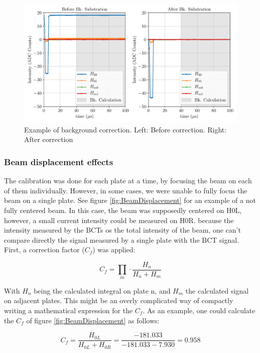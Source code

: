 \begin{figure}[h]
    \centering
    \includegraphics[width=0.85\columnwidth]{Figure_BeforeAfterBackground/BeforeAfterBk.pdf}
    \caption{Example of background correction. Left: Before correction. Right: After correction}
    \label{fig:BackCorrection}
\end{figure}

\subsubsection{Beam displacement effects}

The calibration was done for each plate at a time, by focusing the beam on each of them individually. However, in some cases, we were unable to fully focus the beam on a single plate. See figure \ref{fig:BeamDisplacement} for an example of a not fully centered beam. In this case, the beam was supposedly centered on H0L, however, a small current intensity could be measured on H0R. because the intensity measured by the BCTs os the total intensity of the beam, one can't compare directly the signal measured by a single plate with the BCT signal. First, a correction factor ($C_{f}$) was applied: 

\begin{equation}
    C_f = \prod_{m}  \cdot \frac{H_n}{H_n + H_m}
\end{equation}

With $H_{n}$ being the calculated integral on plate n, and $H_{m}$ the calculated signal on adjacent plates. This might be an overly complicated way of compactly writing a mathematical expression for the $C_{f}$. As an example, one could calculate the $C_{f}$ of figure \ref{fig:BeamDisplacement} as follows:  

\begin{equation}
    C_f = \frac{H_{0L}}{H_{0L}+H_{0R}} = \frac{-181.033}{-181.033-7.930} = 0.958
\end{equation}

